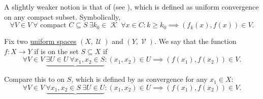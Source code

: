 \begin{definition}
  A slightly weaker notion is that of  (see \cite{ProofWiki:compact_convergence}), which is defined as uniform convergence on any compact subset. Symbolically,
  \begin{equation}\label{def:function_net_convergence/compact}
    \forall V \in V \ \forall \text{ compact } C \subseteq S \ \exists k_0 \in \mscrK \ \forall x \in C : k \geq k_0 \implies (f_k(x), f(x)) \in V.
  \end{equation}
\end{definition}

\begin{definition}\label{def:uniform_continuity}
  Fix two \hyperref[def:uniform_space]{uniform spaces} \( (X, \mscrU) \) and \( (Y, \mscrV) \). We say that the function \( f: X \to Y \) if is  on the set \( S \subseteq X \) if
  \begin{equation}\label{def:uniform_continuity/uniform}
    \forall V \in V \ \underbrace{\exists U \in U \ \forall x_1, x_2 \in S} : (x_1, x_2) \in U \implies (f(x_1), f(x_2)) \in V.
  \end{equation}

  Compare this to  on \( S \), which is defined by  as convergence for any \( x_1 \in X \):
  \begin{equation}\label{def:uniform_continuity/pointwise}
    \forall V \in V \ \underbrace{\forall x_1, x_2 \in S \ \exists U \in U} : (x_1, x_2) \in U \implies (f(x_1), f(x_2)) \in V.
  \end{equation}
\end{definition}

